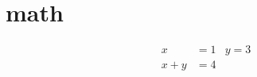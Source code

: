 \documentclass[a4paper,11pt]{article}
\begin{document}
	\section{math}
	
	\begin{align*}
		x&=1&y=3\\
		x+y&=4
	\end{align*}
\end{document}
